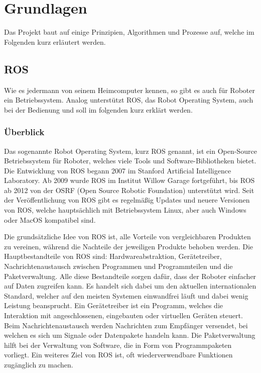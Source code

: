 
\section{Grundlagen}
{
	Das Projekt baut auf einige Prinzipien, Algorithmen und Prozesse auf, welche im Folgenden kurz erläutert werden.
	\subsection{ROS}
	{
		Wie es jedermann von seinem Heimcomputer kennen, so gibt es auch für Roboter ein Betriebssystem. Analog unterstützt ROS, das Robot Operating System, auch bei der Bedienung und soll im folgenden kurz erklärt werden.		\subsubsection{Überblick}
		{
			Das sogenannte Robot Operating System, kurz ROS genannt, ist ein Open-Source Betriebssystem für Roboter, welches viele Tools und Software-Bibliotheken bietet. Die Entwicklung von ROS begann 2007 im Stanford Artificial Intelligence Laboratory. Ab 2009 wurde ROS im Institut Willow Garage fortgeführt\parencite{Quigley09}, bis ROS ab 2012 von der OSRF (Open Source Robotic Foundation) unterstützt wird. Seit der Veröffentlichung von ROS gibt es regelmäßig Updates und neuere Versionen von ROS, welche hauptsächlich mit Betriebssystem Linux, aber auch Windows oder MacOS kompatibel sind. \parencite{roshistoryconst}
			
			Die grundsätzliche Idee von ROS ist, alle Vorteile von vergleichbaren Produkten zu vereinen, während die Nachteile der jeweiligen Produkte behoben werden. Die Hauptbestandteile von ROS sind: Hardwareabstraktion, Gerätetreiber, Nachrichtenaustausch zwischen Programmen und Programmteilen und die Paketverwaltung. Alle diese Bestandteile sorgen dafür, dass der Roboter einfacher auf Daten zugreifen kann. Es handelt sich dabei um den aktuellen internationalen Standard, welcher auf den meisten Systemen einwandfrei läuft und dabei wenig Leistung beansprucht. Ein Gerätetreiber ist ein Programm, welches die Interaktion mit angeschlossenen, eingebauten oder virtuellen Geräten steuert. Beim Nachrichtenaustausch werden Nachrichten zum Empfänger versendet, bei welchen es sich um Signale oder Datenpakete handeln kann. Die Paketverwaltung hilft bei der Verwaltung von Software, die in Form von Programmpaketen vorliegt. Ein weiteres Ziel von ROS ist, oft wiederverwendbare Funktionen zugänglich zu machen. \parencite{roswikiintro}
			
}}}
